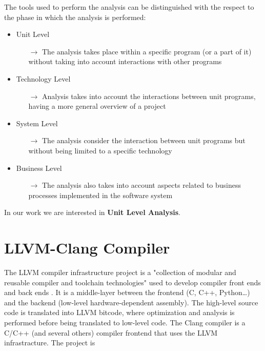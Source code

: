 The tools used to perform the analysis can be distinguished with the respect to the phase in which the analysis is performed:

\begin{itemize}
	\item Unit Level
	\begin{itemize}
		\item[$\rightarrow$] The analysis takes place within a specific program (or a part of it) without taking into account interactions with other programs
	\end{itemize}
	\item Technology Level
	\begin{itemize}
		\item[$\rightarrow$] Analysis takes into account the interactions between unit programs, having a more general overview of a project
	\end{itemize}
	\item System Level
	\begin{itemize}
		\item[$\rightarrow$] The analysis consider the interaction between unit programs but without being limited to a specific technology
	\end{itemize}
	\item Business Level
	\begin{itemize}
		\item[$\rightarrow$] The analysis also takes into account aspects related to business processes implemented in the software system
	\end{itemize}
\end{itemize}

In our work we are interested in \textbf{Unit Level Analysis}.
\pagebreak

\section{LLVM-Clang Compiler}

The LLVM compiler infrastructure project is a "collection of modular and reusable compiler and toolchain technologies" used to develop compiler front ends and back ends \cite{bibitem1}. It is a middle-layer between the frontend (C, C++, Python\dots) and the backend (low-level hardware-dependent assembly). The high-level source code is translated into LLVM bitcode, where optimization and analysis is performed before being translated to low-level code.\newline\newline
The Clang compiler is a C/C++ (and several others) compiler frontend that uses the LLVM infrastracture.\newline
The project is 